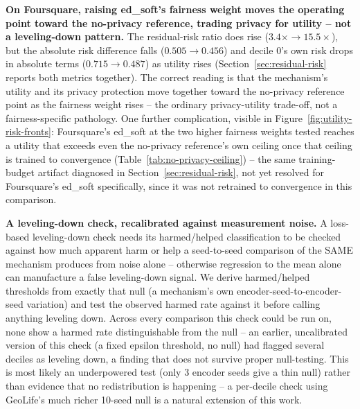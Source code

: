 \textbf{On Foursquare, raising ed\_soft's fairness weight moves the
operating point toward the no-privacy reference, trading privacy for
utility -- not a leveling-down pattern.} The residual-risk ratio does
rise ($3.4\times \to 15.5\times$), but the absolute risk difference
falls ($0.505 \to 0.456$) and decile 0's own risk drops in absolute
terms ($0.715 \to 0.487$) as utility rises (Section~\ref{sec:residual-risk}
reports both metrics together). The correct reading is that the
mechanism's utility and its privacy protection move together toward the
no-privacy reference point as the fairness weight rises -- the ordinary
privacy-utility trade-off, not a fairness-specific pathology. One
further complication, visible in Figure~\ref{fig:utility-risk-fronts}:
Foursquare's ed\_soft at the two higher fairness weights tested reaches
a utility that exceeds even the no-privacy reference's own ceiling once
that ceiling is trained to convergence (Table~\ref{tab:no-privacy-ceiling})
-- the same training-budget artifact diagnosed in
Section~\ref{sec:residual-risk}, not yet resolved for Foursquare's
ed\_soft specifically, since it was not retrained to convergence in
this comparison.

\textbf{A leveling-down check, recalibrated against measurement noise.}
A loss-based leveling-down check needs its harmed/helped classification
to be checked against how much apparent harm or help a seed-to-seed
comparison of the SAME mechanism produces from noise alone --
otherwise regression to the mean alone can manufacture a false
leveling-down signal. We derive harmed/helped thresholds from exactly
that null (a mechanism's own encoder-seed-to-encoder-seed variation)
and test the observed harmed rate against it before calling anything
leveling down. Across every comparison this check could be run on, none
show a harmed rate distinguishable from the null -- an earlier,
uncalibrated version of this check (a fixed epsilon threshold, no null)
had flagged several deciles as leveling down, a finding that does not
survive proper null-testing. This is most likely an underpowered test
(only 3 encoder seeds give a thin null) rather than evidence that no
redistribution is happening -- a per-decile check using GeoLife's much
richer 10-seed null is a natural extension of this work.

